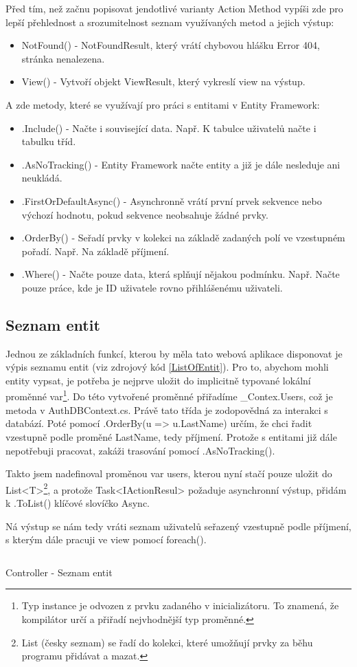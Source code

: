 \documentclass[a4paper, 12pt]{report}
\begin{document}
	Před tím, než začnu popisovat jendotlivé varianty Action Method vypíši zde pro lepší přehlednost a srozumitelnost seznam využívaných metod a jejich výstup:
	\begin{itemize}
		\item NotFound() - NotFoundResult, který vrátí chybovou hlášku Error 404, stránka nenalezena.
		\item View() - Vytvoří objekt ViewResult, který vykreslí view na výstup.
	\end{itemize}
	A zde metody, které se využívají pro práci s entitami v Entity Framework:
	\begin{itemize}
		\item .Include() - Načte i související data. Např. K tabulce uživatelů načte i tabulku tříd.
		\item .AsNoTracking() - Entity Framework načte entity a již je dále nesleduje ani neukládá.
		\item .FirstOrDefaultAsync() - Asynchronně vrátí první prvek sekvence nebo výchozí hodnotu, pokud sekvence neobsahuje žádné prvky.
		\item .OrderBy() - Seřadí prvky v kolekci na základě zadaných polí ve vzestupném pořadí. Např. Na základě příjmení.
		\item .Where() - Načte pouze data, která splňují nějakou podmínku. Např. Načte pouze práce, kde je ID uživatele rovno přihlášenému uživateli.
	\end{itemize}
	\subsection{Seznam entit} \label{Seznam_entit}
	Jednou ze základních funkcí, kterou by měla tato webová aplikace disponovat je výpis seznamu entit (viz zdrojový kód \ref{ListOfEntit}). Pro to, abychom mohli entity vypsat, je potřeba je nejprve uložit do implicitně typované lokální proměnné var\footnote{Typ instance je odvozen z prvku zadaného v inicializátoru. To znamená, že kompilátor určí a přiřadí nejvhodnější typ proměnné.}. Do této vytvořené proměnné přiřadíme \_Contex.Users, což je metoda v AuthDBContext.cs. Právě tato třída je zodopovědná za interakci s databází. Poté pomocí .OrderBy(u => u.LastName) určím, že chci řadit vzestupně podle proměné LastName, tedy příjmení. Protože s entitami již dále nepotřebuji pracovat, zakáži trasování pomocí .AsNoTracking().\par
	Takto jsem nadefinoval proměnou var users, kterou nyní stačí pouze uložit do List<T>\footnote{List (česky seznam) se řadí do kolekci, které umožňují prvky za běhu programu přidávat a mazat.}, a protože Task<IActionResul> požaduje asynchronní výstup, přidám k .ToList() klíčové slovíčko Async.\par
	Ná výstup se nám tedy vráti seznam uživatelů seřazený vzestupně podle příjmení, s kterým dále pracuji ve view pomocí foreach().
	\begin{listing}[H]
		\inputminted{csharp}{SourceCode/Controllers/ListOfEntit.cs}
		\caption{Controller - Seznam entit}
		\label{ListOfEntit}
	\end{listing}
\end{document}
